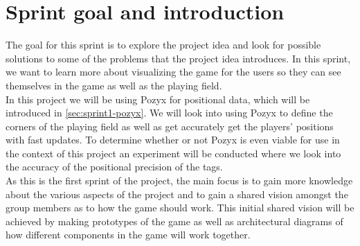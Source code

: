 \section{Sprint goal and introduction}\label{sec:sprint1-goals}
The goal for this sprint is to explore the project idea and look for possible solutions to some of the problems that the project idea introduces.
In this sprint, we want to learn more about visualizing the game for the users so they can see themselves in the game as well as the playing field. \\
In this project we will be using Pozyx for positional data, which will be introduced in \autoref{sec:sprint1-pozyx}.
We will look into using Pozyx to define the corners of the playing field as well as get accurately get the players' positions with fast updates.
To determine whether or not Pozyx is even viable for use in the context of this project an experiment will be conducted where we look into the accuracy of the positional precision of the tags. \\
As this is the first sprint of the project, the main focus is to gain more knowledge about the various aspects of the project and to gain a shared vision amongst the group members as to how the game should work.
This initial shared vision will be achieved by making prototypes of the game as well as architectural diagrams of how different components in the game will work together.
